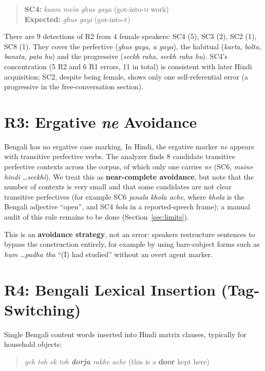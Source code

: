 \documentclass[11pt,a4paper]{report}
\begin{document}
\begin{quote}
  \textbf{SC4:} \textit{kaam mein ghus gaya} (got-into-\textsc{m} work)\\
  \textbf{Expected:} \textit{ghus gayi} (got-into-\textsc{f})
\end{quote}

There are 9 detections of R2 from 4 female speakers: SC4 (5), SC3 (2), SC2 (1), SC8 (1). They cover the perfective (\textit{ghus gaya}, \textit{a gaya}), the habitual (\textit{karta}, \textit{bolta}, \textit{banata}, \textit{pata hu}) and the progressive (\textit{seekh raha}, \textit{seekh raha hu}). SC4's concentration (5 R2 and 6 R1 errors, 11 in total) is consistent with later Hindi acquisition; SC2, despite being female, shows only one self-referential error (a progressive in the free-conversation section).

\section{R3: Ergative \textit{ne} Avoidance}

Bengali has no ergative case marking. In Hindi, the ergative marker \textit{ne} appears with transitive perfective verbs. The analyzer finds 8 candidate transitive perfective contexts across the corpus, of which only one carries \textit{ne} (SC6, \textit{maine hindi \ldots seekhi}). We treat this as \textbf{near-complete avoidance}, but note that the number of contexts is very small and that some candidates are not clear transitive perfectives (for example SC6 \textit{janala khola ache}, where \textit{khola} is the Bengali adjective ``open'', and SC4 \textit{bola} in a reported-speech frame); a manual audit of this rule remains to be done (Section~\ref{sec:limits}).

This is an \textbf{avoidance strategy}, not an error: speakers restructure sentences to bypass the construction entirely, for example by using bare-subject forms such as \textit{hum \ldots padha tha} ``(I) had studied'' without an overt agent marker.

\section{R4: Bengali Lexical Insertion (Tag-Switching)}

Single Bengali content words inserted into Hindi matrix clauses, typically for household objects:

\begin{quote}
  \textit{yeh toh ek toh \textbf{dorja} rakhe ache} (this is a \textbf{door} kept here)
\end{quote}
\end{document}
